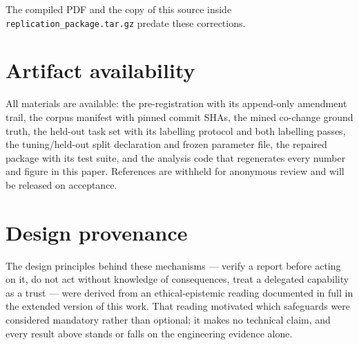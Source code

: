 \documentclass[sigconf,review,anonymous]{acmart}
\begin{document}
The compiled PDF and the copy of this source inside \texttt{replication\_package.tar.gz} predate
these corrections.

\section*{Artifact availability}

All materials are available: the pre-registration with its append-only amendment trail, the corpus manifest
with pinned commit SHAs, the mined co-change ground truth, the held-out task set with its labelling protocol
and both labelling passes, the tuning/held-out split declaration and frozen parameter file, the repaired
package with its test suite, and the analysis code that regenerates every number and figure in this paper.
References are withheld for anonymous review and will be released on acceptance.

\section*{Design provenance}

The design principles behind these mechanisms --- verify a report before acting on it, do not act
without knowledge of consequences, treat a delegated capability as a trust --- were derived from an
ethical-epistemic reading documented in full in the extended version of this work. That reading
motivated which safeguards were considered mandatory rather than optional; it makes no technical
claim, and every result above stands or falls on the engineering evidence alone.



\end{document}
